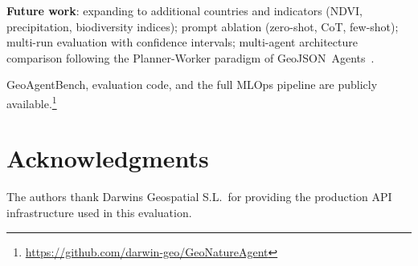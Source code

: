 \documentclass[10pt,twocolumn]{article}
\begin{document}
\noindent\textbf{Future work}: expanding to additional countries and indicators (NDVI, precipitation, biodiversity indices); prompt ablation (zero-shot, CoT, few-shot); multi-run evaluation with confidence intervals; multi-agent architecture comparison following the Planner-Worker paradigm of GeoJSON~Agents~\cite{luo2025geojsonagents}.

GeoAgentBench, evaluation code, and the full MLOps pipeline are publicly available.\footnote{\url{https://github.com/darwin-geo/GeoNatureAgent}}


\section*{Acknowledgments}

The authors thank Darwins Geospatial S.L.\ for providing the production API infrastructure used in this evaluation.



\end{document}
